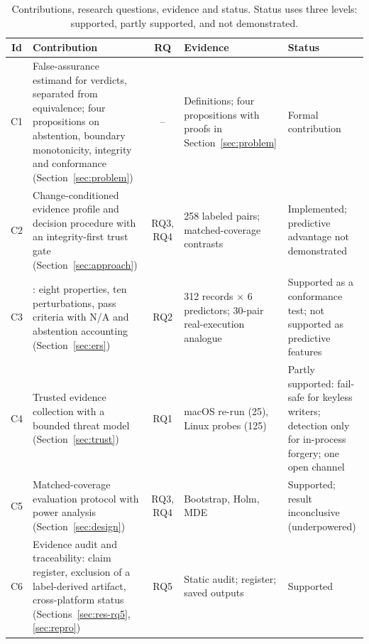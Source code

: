 \begin{table}[!t]
\caption{Contributions, research questions, evidence and status. Status uses three levels: supported, partly supported, and not demonstrated.}
\label{tab:contrib}
\centering
\scriptsize
\setlength{\tabcolsep}{3pt}
\begin{tabular}{|c|L{4.2cm}|c|L{4.6cm}|L{4.0cm}|}
\hline
Id & Contribution & RQ & Evidence & Status \\
\hline
C1 & False-assurance estimand for \NDO{} verdicts, separated from equivalence; four propositions on abstention, boundary monotonicity, integrity and conformance (Section~\ref{sec:problem}) & -- & Definitions; four propositions with proofs in Section~\ref{sec:problem} & Formal contribution \\
C2 & Change-conditioned evidence profile and \cec{} decision procedure with an integrity-first trust gate (Section~\ref{sec:approach}) & RQ3, RQ4 & 258 labeled pairs; matched-coverage contrasts & Implemented; predictive advantage not demonstrated \\
C3 & \ers{}: eight properties, ten perturbations, pass criteria with N/A and abstention accounting (Section~\ref{sec:ers}) & RQ2 & 312 records $\times$ 6 predictors; 30-pair real-execution analogue & Supported as a conformance test; not supported as predictive features \\
C4 & Trusted evidence collection with a bounded threat model (Section~\ref{sec:trust}) & RQ1 & macOS re-run (25), Linux probes (125) & Partly supported: fail-safe for keyless writers; detection only for in-process forgery; one open channel \\
C5 & Matched-coverage evaluation protocol with power analysis (Section~\ref{sec:design}) & RQ3, RQ4 & Bootstrap, Holm, MDE & Supported; result inconclusive (underpowered) \\
C6 & Evidence audit and traceability: claim register, exclusion of a label-derived artifact, cross-platform status (Sections~\ref{sec:res-rq5}, \ref{sec:repro}) & RQ5 & Static audit; register; saved outputs & Supported \\
\hline
\end{tabular}
\end{table}
